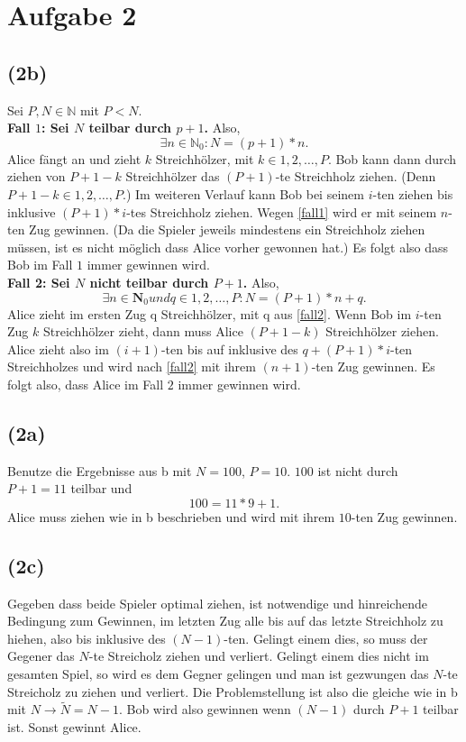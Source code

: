 \documentclass[a4paper,11pt,twoside]{report}
\theoremstyle{definition}
\theoremstyle{plain}
\theoremstyle{remark}
\begin{document}
\section*{Aufgabe 2}
\subsection*{(2b)}
Sei $P,N\in \mathbb{N}$ mit $P<N$.\\
\textbf{Fall $1$: Sei $N$ teilbar durch $p+1$.} Also,
\begin{equation}
\exists n\in\mathbb{N}_0 : N=(p+1)*n.\label{fall1}
\end{equation}
Alice fängt an und zieht $k$ Streichhölzer, mit $k\in{1,2,\dots,P}$. Bob kann dann durch ziehen von $P+1-k$ Streichhölzer das $(P+1)$-te Streichholz ziehen. (Denn $P+1-k\in{1,2,\dots,P}$.) Im weiteren Verlauf kann Bob bei seinem $i$-ten ziehen bis inklusive $(P+1)*i$-tes Streichholz ziehen. Wegen \eqref{fall1} wird er mit seinem $n$-ten Zug gewinnen. (Da die Spieler jeweils mindestens ein Streichholz ziehen müssen, ist es nicht möglich dass Alice vorher gewonnen hat.) Es folgt also dass Bob im Fall $1$ immer gewinnen wird.\\

\textbf{Fall 2: Sei $N$ nicht teilbar durch $P+1$.} Also,
\begin{equation}
\exists n\in\mathbf{N}_0 und q\in{1,2,\dots,P}:N=(P+1)*n+q.\label{fall2}
\end{equation}
Alice zieht im ersten Zug q Streichhölzer, mit q aus \eqref{fall2}. Wenn Bob im $i$-ten Zug $k$ Streichhölzer zieht, dann muss Alice $(P+1-k)$ Streichhölzer ziehen. Alice zieht also im $(i+1)$-ten bis auf inklusive des $q+(P+1)*i$-ten Streichholzes und wird nach \eqref{fall2} mit ihrem $(n+1)$-ten Zug gewinnen. Es folgt also, dass Alice im Fall $2$ immer gewinnen wird.

\subsection*{(2a)}
Benutze die Ergebnisse aus b mit $N=100$, $P=10$. $100$ ist nicht durch $P+1=11$ teilbar und
\begin{equation}
100=11*9+1.
\end{equation}
Alice muss ziehen wie in b beschrieben und wird mit ihrem $10$-ten Zug gewinnen. 

\subsection*{(2c)}
Gegeben dass beide Spieler optimal ziehen, ist notwendige und hinreichende Bedingung zum Gewinnen, im letzten Zug alle bis auf das letzte Streichholz zu hiehen, also bis inklusive des $(N-1)$-ten. Gelingt einem dies, so muss der Gegener das $N$-te Streicholz ziehen und verliert. Gelingt einem dies nicht im gesamten Spiel, so wird es dem Gegner gelingen und man ist gezwungen das $N$-te Streicholz zu ziehen und verliert. Die Problemstellung ist also die gleiche wie in b mit $N\rightarrow\tilde{N}=N-1$. Bob wird also gewinnen wenn $(N-1)$ durch $P+1$ teilbar ist. Sonst gewinnt Alice.
\end{document}
